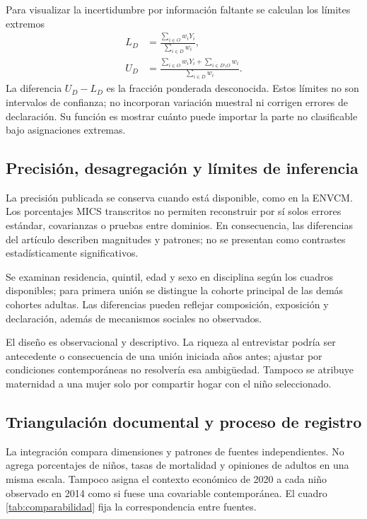 \documentclass[11pt,a4paper]{article}
\begin{document}
Para visualizar la incertidumbre por información faltante se calculan los
límites extremos
\begin{align}
 L_D&=\frac{\sum_{i\in O}w_iY_i}{\sum_{i\in D}w_i},\\
 U_D&=\frac{\sum_{i\in O}w_iY_i+\sum_{i\in D\setminus O}w_i}
 {\sum_{i\in D}w_i}.
 \label{eq:limites}
\end{align}
La diferencia $U_D-L_D$ es la fracción ponderada desconocida. Estos límites
no son intervalos de confianza; no incorporan variación muestral ni corrigen
errores de declaración. Su función es mostrar cuánto puede importar la parte
no clasificable bajo asignaciones extremas.

\subsection{Precisión, desagregación y límites de inferencia}
La precisión publicada se conserva cuando está disponible, como en la
ENVCM. Los porcentajes MICS transcritos no permiten reconstruir por sí solos
errores estándar, covarianzas o pruebas entre dominios. En consecuencia,
las diferencias del artículo describen magnitudes y patrones; no se
presentan como contrastes estadísticamente significativos.

Se examinan residencia, quintil, edad y sexo en disciplina según los cuadros
disponibles; para primera unión se distingue la cohorte principal de las
demás cohortes adultas. Las diferencias pueden reflejar composición,
exposición y declaración, además de mecanismos sociales no observados.

El diseño es observacional y descriptivo. La riqueza al entrevistar podría
ser antecedente o consecuencia de una unión iniciada años antes; ajustar
por condiciones contemporáneas no resolvería esa ambigüedad. Tampoco se
atribuye maternidad a una mujer solo por compartir hogar con el niño seleccionado.

\subsection{Triangulación documental y proceso de registro}
La integración compara dimensiones y patrones de fuentes independientes.
No agrega porcentajes de niños, tasas de mortalidad y opiniones de adultos
en una misma escala. Tampoco asigna el contexto económico de 2020 a cada
niño observado en 2014 como si fuese una covariable contemporánea.
El cuadro \ref{tab:comparabilidad} fija la correspondencia entre fuentes.
\end{document}
